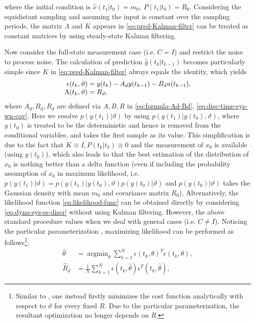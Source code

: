\documentclass[letterpaper,10pt,journal,final]{IEEEtran}
\theoremstyle{definition}
\theoremstyle{remark}
\begin{document}
where the initial condition is $\hat{x}(t_1|t_{0}) = m_0,\ P(t_1|t_{0}) = R_0$.
Considering the equidistant sampling and assuming the input is constant over the
sampling periods, the matrix $\Lambda$ and $K$ appears in
\eqref{eq:pred-Kalman-filter} can be treated as constant matrices by using
steady-state Kalman filtering\cite[Sec.~3.6]{Astrom1980}.



Now consider the full-state measurement case (i.e. $C = I$) and restrict the noise to
process noise. The calculation of prediction $\hat{y}(t_k|t_{k-1})$ becomes
particularly simple since $K$ in \eqref{eq:pred-Kalman-filter} always equals the
identity, which yields
\begin{equation}
  \label{eq:special-case-pred-y}
  \begin{array}{r@{\;}l}
    \epsilon(t_k, \vartheta) &= y(t_k) - A_d y(t_{k-1}) - B_d u(t_{k-1}),\\
    \Lambda(t_k, \vartheta) &= R_d,
\end{array}
\end{equation}
where $A_d, B_d, R_d$ are defined via $A,B,R$ in \eqref{eq:formula-Ad-Bd}, \eqref{eq:disc-time-sys-wn-cov}.
Here we resolve $p(y(t_1)|\vartheta)$ by using $p(y(t_1)|y(t_0), \vartheta)$,
where $y(t_0)$ is treated to be the deterministic and hence is removed from the
conditional variables, and takes the first sample as its value. This
simplification is due to the fact that $K \equiv I, P(t_k|t_k) \equiv 0$ and the
measurement of $x_0$ is available (using $y(t_0)$), which also leads to that the
best estimation of the distribution of $x_0$ is nothing better than a delta
function (even if including the probability assumption of $x_0$ in maximum
likelihood, i.e.
$p(y(t_1)|\vartheta) = p(y(t_1)|y(t_0), \vartheta) p(y(t_0)|\vartheta)$ and
$p(y(t_0)|\vartheta)$ takes the Gaussian density with mean $m_0$ and covariance
matrix $R_0$). Alternatively, the likelihood function \eqref{eq:likelihood-func}
can be obtained directly by considering \eqref{eq:dyna-sys-ss-discr} without
using Kalman filtering. However, the above standard procedure values when we
deal with general cases (i.e. $C \neq I$).  Noticing the particular
parameterization \cite[p.~92,~206]{Ljung1998}, maximizing likelihood can be
performed as follows\footnote{Similar to \cite[p.~219]{Ljung1998}, one instead
  firstly minimizes the cost function analytically with respect to $\vartheta$
  for every fixed $R$. Due to the particular parameterization, the resultant
  optimization no longer depends on $R$.}:
\begin{subequations}
  \label{eq:ML-2steps}
  \begin{align}
    \label{eq:ML-2steps-PEM}
    \hat{\theta} &= \textstyle\operatorname{argmin}_{\theta} \sum_{k=1}^N \epsilon(t_k,\theta)^T \epsilon(t_k,\theta),\\
    \label{eq:ML-2steps-R}
    \hat{R}_d &= \textstyle\frac{1}{N} \sum_{k=1}^N
\epsilon(t_k,\hat{\theta}) \epsilon^T(t_k, \hat{\theta}),
  \end{align}
\end{subequations}
\end{document}
